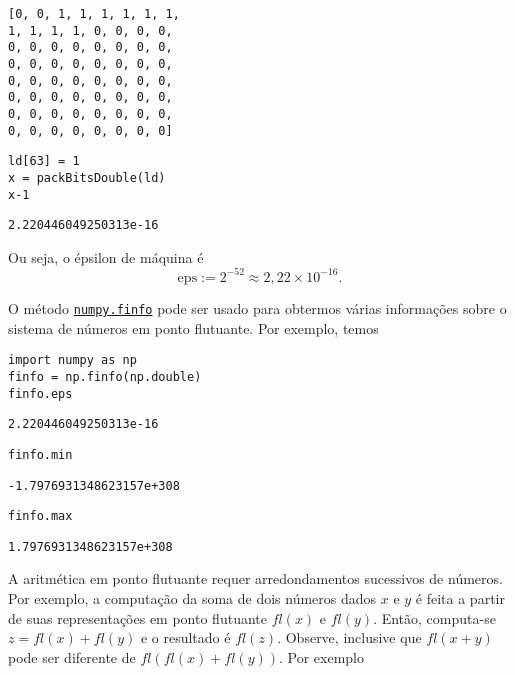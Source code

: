 \begin{verbatim}
[0, 0, 1, 1, 1, 1, 1, 1,
1, 1, 1, 1, 0, 0, 0, 0,
0, 0, 0, 0, 0, 0, 0, 0,
0, 0, 0, 0, 0, 0, 0, 0,
0, 0, 0, 0, 0, 0, 0, 0,
0, 0, 0, 0, 0, 0, 0, 0,
0, 0, 0, 0, 0, 0, 0, 0,
0, 0, 0, 0, 0, 0, 0, 0]
\end{verbatim}

\begin{lstlisting}
ld[63] = 1
x = packBitsDouble(ld)
x-1
\end{lstlisting}

\begin{verbatim}
2.220446049250313e-16
\end{verbatim}


Ou seja, o épsilon de máquina é
\begin{equation}
  \mathrm{eps} := 2^{-52} \approx 2,22\times 10^{-16}.
\end{equation}

\begin{obs}
  O método \href{https://numpy.org/doc/stable/reference/generated/numpy.finfo.html}{\lstinline{numpy.finfo}} pode ser usado para obtermos várias informações sobre o sistema de números em ponto flutuante. Por exemplo, temos

\begin{lstlisting}
import numpy as np
finfo = np.finfo(np.double)
finfo.eps
\end{lstlisting}

\begin{verbatim}
2.220446049250313e-16
\end{verbatim}

\begin{lstlisting}
finfo.min
\end{lstlisting}

\begin{verbatim}
-1.7976931348623157e+308
\end{verbatim}

\begin{lstlisting}
finfo.max
\end{lstlisting}

\begin{verbatim}
1.7976931348623157e+308
\end{verbatim}

\end{obs}

A aritmética em ponto flutuante requer arredondamentos sucessivos de números. Por exemplo, a computação da soma de dois números dados $x$ e $y$ é feita a partir de suas representações em ponto flutuante $fl(x)$ e $fl(y)$. Então, computa-se $z = fl(x)+fl(y)$ e o resultado é $fl(z)$. Observe, inclusive que $fl(x+y)$ pode ser diferente de $fl(fl(x)+fl(y))$. Por exemplo

